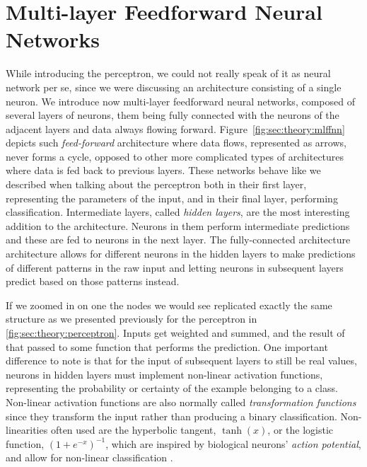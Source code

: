 
\section{Multi-layer Feedforward Neural Networks}
\label{sec:theory:mlffnn}

While introducing the perceptron, we could not really speak of it as neural network per se, since we were discussing an architecture consisting of a single neuron.
We introduce now multi-layer feedforward neural networks, composed of several layers of neurons, them being fully connected with the neurons of the adjacent layers and data always flowing forward.
Figure~\ref{fig:sec:theory:mlffnn} depicts such \emph{feed-forward} architecture where data flows, represented as arrows, never forms a cycle, opposed to other more complicated types of architectures where data is fed back to previous layers.
These networks behave like we described when talking about the perceptron both in their first layer, representing the parameters of the input, and in their final layer, performing classification.
Intermediate layers, called \emph{hidden layers}, are the most interesting addition to the architecture.
Neurons in them perform intermediate predictions and these are fed to neurons in the next layer.
The fully-connected architecture architecture allows for different neurons in the hidden layers to make predictions of different patterns in the raw input and letting neurons in subsequent layers predict based on those patterns instead.

If we zoomed in on one the nodes we would see replicated exactly the same structure as we presented previously for the perceptron in \autoref{fig:sec:theory:perceptron}.
Inputs get weighted and summed, and the result of that passed to some function that performs the prediction.
One important difference to note is that for the input of subsequent layers to still be real values, neurons in hidden layers must implement non-linear activation functions, representing the probability or certainty of the example belonging to a class.
Non-linear activation functions are also normally called \emph{transformation functions} since they transform the input rather than producing a binary classification.
Non-linearities often used are the hyperbolic tangent, $\tanh(x)$, or the logistic function, $(1+e^{-x})^{-1}$, which are inspired by biological neurons' \emph{action potential}, and allow for non-linear classification \cite{Thorpe1989}.

